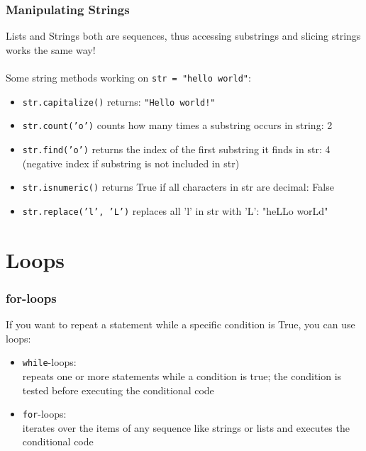 \documentclass{beamer}
\begin{document}
\begin{frame}
\frametitle{Manipulating Strings}
		Lists and Strings both are sequences, thus accessing substrings and slicing strings works the same way! \\ $\,$\\ Some string methods working on \texttt{str = "hello world"}:
		\begin{itemize}
			\item \texttt{str.capitalize()} returns: \texttt{"Hello world!"}
			\item \texttt{str.count('o')} counts how many times a substring occurs in string: 2
			\item \texttt{str.find('o')} returns the index of the first substring it finds in str: 4 (negative index if substring is not included in str)
			\item \texttt{str.isnumeric()} returns True if all characters in str are decimal: False
			\item \texttt{str.replace('l', 'L')} replaces all 'l' in str with 'L': "heLLo worLd"
		\end{itemize}
	
\end{frame}

\section{Loops}

\begin{frame}
\frametitle{for-loops}
	If you want to repeat a statement while a specific condition is True, you can use loops:
	\begin{itemize}
		\item \texttt{while}-loops: \\ repeats one or more statements while a condition is true; the condition is tested before executing the conditional code
		\item \texttt{for}-loops: \\ iterates over the items of any sequence like strings or lists and executes the conditional code
	\end{itemize}
\end{frame}
\end{document}
